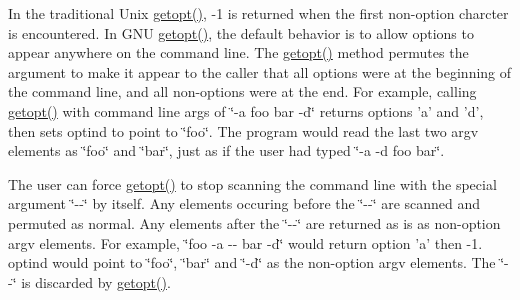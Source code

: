 In the traditional Unix \hyperlink{classgnu_1_1getopt_1_1_getopt_a49e6fc6e18756f5dfaf85c1067325c3b}{getopt()}, -\/1 is returned when the first non-\/option charcter is encountered. In GNU \hyperlink{classgnu_1_1getopt_1_1_getopt_a49e6fc6e18756f5dfaf85c1067325c3b}{getopt()}, the default behavior is to allow options to appear anywhere on the command line. The \hyperlink{classgnu_1_1getopt_1_1_getopt_a49e6fc6e18756f5dfaf85c1067325c3b}{getopt()} method permutes the argument to make it appear to the caller that all options were at the beginning of the command line, and all non-\/options were at the end. For example, calling \hyperlink{classgnu_1_1getopt_1_1_getopt_a49e6fc6e18756f5dfaf85c1067325c3b}{getopt()} with command line args of \char`\"{}-\/a foo bar -\/d\char`\"{} returns options 'a' and 'd', then sets optind to point to \char`\"{}foo\char`\"{}. The program would read the last two argv elements as \char`\"{}foo\char`\"{} and \char`\"{}bar\char`\"{}, just as if the user had typed \char`\"{}-\/a -\/d foo bar\char`\"{}. 

The user can force \hyperlink{classgnu_1_1getopt_1_1_getopt_a49e6fc6e18756f5dfaf85c1067325c3b}{getopt()} to stop scanning the command line with the special argument \char`\"{}-\/-\/\char`\"{} by itself. Any elements occuring before the \char`\"{}-\/-\/\char`\"{} are scanned and permuted as normal. Any elements after the \char`\"{}-\/-\/\char`\"{} are returned as is as non-\/option argv elements. For example, \char`\"{}foo -\/a -\/-\/ bar -\/d\char`\"{} would return option 'a' then -\/1. optind would point to \char`\"{}foo\char`\"{}, \char`\"{}bar\char`\"{} and \char`\"{}-\/d\char`\"{} as the non-\/option argv elements. The \char`\"{}-\/-\/\char`\"{} is discarded by \hyperlink{classgnu_1_1getopt_1_1_getopt_a49e6fc6e18756f5dfaf85c1067325c3b}{getopt()}. 

